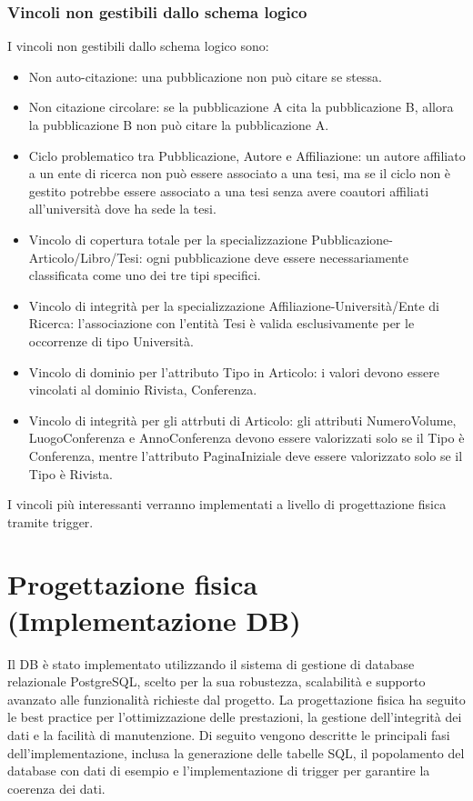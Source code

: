 \documentclass[a4paper,12pt]{article}
\begin{document}
\subsubsection*{Vincoli non gestibili dallo schema logico} 
I vincoli non gestibili dallo schema logico sono:
\begin{itemize}
    \item Non auto-citazione: una pubblicazione non può citare se stessa.
    \item Non citazione circolare: se la pubblicazione A cita la pubblicazione B, allora la pubblicazione B non può citare la pubblicazione A.
    \item Ciclo problematico tra Pubblicazione, Autore e Affiliazione: un autore affiliato a un ente di ricerca non può essere associato a una tesi, ma se il ciclo non è gestito potrebbe essere associato a una tesi senza avere coautori affiliati all'università dove ha sede la tesi.
    \item Vincolo di copertura totale per la specializzazione Pubblicazione-Articolo/Libro/Tesi: ogni pubblicazione deve essere necessariamente classificata come uno dei tre tipi specifici.
    \item Vincolo di integrità per la specializzazione Affiliazione-Università/Ente di Ricerca: l'associazione con l'entità Tesi è valida esclusivamente per le occorrenze di tipo Università.
    \item Vincolo di dominio per l'attributo Tipo in Articolo: i valori devono essere vincolati al dominio {Rivista, Conferenza}.
    \item Vincolo di integrità per gli attrbuti di Articolo: gli attributi NumeroVolume, LuogoConferenza e AnnoConferenza devono essere valorizzati solo se il Tipo è Conferenza, mentre l'attributo PaginaIniziale deve essere valorizzato solo se il Tipo è Rivista.
\end{itemize} 
I vincoli più interessanti verranno implementati a livello di progettazione fisica tramite trigger.

\section{Progettazione fisica (Implementazione DB)} \label{sec:progettazione-fisica}
Il DB è stato implementato utilizzando il sistema di gestione di database relazionale PostgreSQL, scelto per la sua robustezza, scalabilità e supporto avanzato alle funzionalità richieste dal progetto. La progettazione fisica ha seguito le best practice per l'ottimizzazione delle prestazioni, la gestione dell'integrità dei dati e la facilità di manutenzione. Di seguito vengono descritte le principali fasi dell'implementazione, inclusa la generazione delle tabelle SQL, il popolamento del database con dati di esempio e l'implementazione di trigger per garantire la coerenza dei dati.
\end{document}
